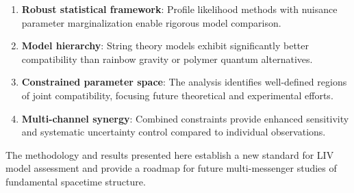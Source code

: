 \documentclass[11pt]{article}
\begin{document}
\begin{enumerate}
    \item \textbf{Robust statistical framework}: Profile likelihood methods with nuisance parameter marginalization enable rigorous model comparison.

    \item \textbf{Model hierarchy}: String theory models exhibit significantly better compatibility than rainbow gravity or polymer quantum alternatives.

    \item \textbf{Constrained parameter space}: The analysis identifies well-defined regions of joint compatibility, focusing future theoretical and experimental efforts.

    \item \textbf{Multi-channel synergy}: Combined constraints provide enhanced sensitivity and systematic uncertainty control compared to individual observations.
\end{enumerate}

The methodology and results presented here establish a new standard for LIV model assessment and provide a roadmap for future multi-messenger studies of fundamental spacetime structure.
\end{document}
